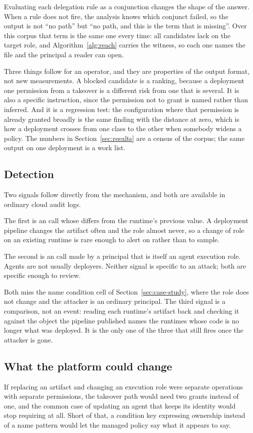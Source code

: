 Evaluating each delegation rule as a conjunction changes the shape of the
answer. When a rule does not fire, the analysis knows which conjunct failed,
so the output is not ``no path'' but ``no path, and this is the term that is
missing''. Over this corpus that term is the same one every time: all
\nBlocked candidates lack  on the target role, and
Algorithm~\ref{alg:reach} carries the witness, so each one names the file and
the principal a reader can open.

Three things follow for an operator, and they are properties of the output
format, not new measurements. A blocked candidate is a ranking, because
a deployment one permission from a takeover is a different risk from one that
is several. It is also a specific instruction, since the permission not to
grant is named rather than inferred. And it is a regression test: the
\nPassRoleWide configuration where that permission is already granted broadly
is the same finding with the distance at zero, which is how a deployment
crosses from one class to the other when somebody widens a policy. The
numbers in Section~\ref{sec:results} are a census of the corpus; the same
output on one deployment is a work list.

\subsection{Detection}

Two signals follow directly from the mechanism, and both are available in
ordinary cloud audit logs.

The first is an  call whose  differs from
the runtime's previous value. A deployment pipeline changes the artifact often
and the role almost never, so a change of role on an existing runtime is rare
enough to alert on rather than to sample.

The second is an  call made by a principal that is
itself an agent execution role. Agents are not usually deployers. Neither
signal is specific to an attack; both are specific enough to review.

Both miss the name condition cell of Section~\ref{sec:case-study}, where the
role does not change and the attacker is an ordinary principal. The third
signal is a comparison, not an event: reading each runtime's artifact
back and checking it against the object the pipeline published names the
runtimes whose code is no longer what was deployed. It is the only one of the
three that still fires once the attacker is gone.

\subsection{What the platform could change}

If replacing an artifact and changing an execution role were separate
operations with separate permissions, the takeover path would need two grants
instead of one, and the common case of updating an agent that keeps its
identity would stop requiring  at all. Short of that, a
condition key expressing ownership instead of a name pattern would let the
managed policy say what it appears to say.
